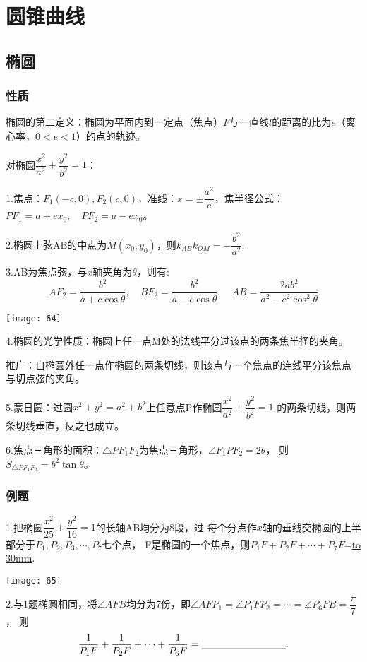 \section{圆锥曲线}
\subsection{椭圆}
\subsubsection{性质}
椭圆的第二定义：椭圆为平面内到一定点（焦点）$F$与一直线$l$的距离的比为$e$（离心率，$0<e<1$）的点的轨迹。

对椭圆$\dfrac{x^2}{a^2}+\dfrac{y^2}{b^2}=1$：

1.焦点：$F_1(-c,0),F_2(c,0)$，准线：$x=\pm \dfrac{a^2}{c}$，焦半径公式：$PF_1=a+ex_0,\quad PF_2=a-ex_0$。

2.椭圆上弦AB的中点为$M(x_0,y_0)$，则$k_{AB}k_{OM}=-\dfrac{b^2}{a^2}$.

3.AB为焦点弦，与$x$轴夹角为$\theta$，则有:
\[AF_2=\dfrac{b^2}{a+c\cos{\theta}},\quad BF_2=\dfrac{b^2}{a-c\cos{\theta}},\quad 
AB=\dfrac{2ab^2}{a^2-c^2\cos^2{\theta}}\]
\begin{center}
\texttt{[image: 64]}
\end{center}

4.椭圆的光学性质：椭圆上任一点M处的法线平分过该点的两条焦半径的夹角。

推广：自椭圆外任一点作椭圆的两条切线，则该点与一个焦点的连线平分该焦点
与切点弦的夹角。

5.蒙日圆：过圆$x^2+y^2=a^2+b^2$上任意点P作椭圆$\dfrac{x^2}{a^2}+\dfrac{y^2}{b^2}=1$
的两条切线，则两条切线垂直，反之也成立。

6.焦点三角形的面积：$\bigtriangleup PF_1F_2$为焦点三角形，$\angle F_1PF_2=2\theta$，
则$S_{\bigtriangleup PF_1F_2}=b^2\tan{\theta}$。

\subsubsection{例题}
1.把椭圆$\dfrac{x^2}{25}+\dfrac{y^2}{16}=1$的长轴AB均分为8段，过
每个分点作$x$轴的垂线交椭圆的上半部分于$P_1,P_2,P_3,\cdots,P_7$七个点，
F是椭圆的一个焦点，则$P_1F+P_2F+\cdots +P_7F$=\underline{\hbox to 30mm{}}.

\begin{center}
    \texttt{[image: 65]}
\end{center}

2.与1题椭圆相同，将$\angle AFB$均分为7份，即$\angle AFP_1=\angle P_1FP_2=\cdots=\angle P_6FB=\dfrac{\pi}{7}$，
则
\[\dfrac{1}{P_1F}+\dfrac{1}{P_2F}+\cdots+\dfrac{1}{P_6F}=\underline{\hbox to 30mm{}}.\]

